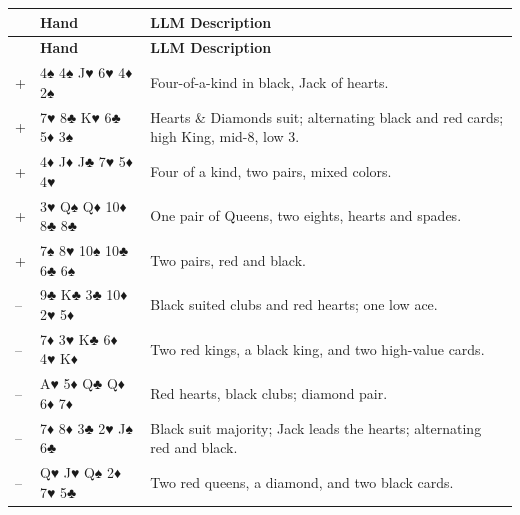 \documentclass[11pt,a4paper]{article}
\begin{document}
\begin{longtable}{C{0.5cm} L{4.5cm} L{9cm}}
\toprule
\textbf{} & \textbf{Hand} & \textbf{LLM Description} \\
\midrule
\endfirsthead
\toprule
\textbf{} & \textbf{Hand} & \textbf{LLM Description} \\
\midrule
\endhead
{} + & 4♠ 4♠ J♥ 6♥ 4♦ 2♠ & Four-of-a-kind in black, Jack of hearts. \\
 + & 7♥ 8♣ K♥ 6♣ 5♦ 3♠ & Hearts \& Diamonds suit; alternating black and red cards; high King, mid-8, low 3. \\
 + & 4♦ J♦ J♣ 7♥ 5♦ 4♥ & Four of a kind, two pairs, mixed colors. \\
 + & 3♥ Q♠ Q♦ 10♦ 8♣ 8♣ & One pair of Queens, two eights, hearts and spades. \\
 + & 7♠ 8♥ 10♠ 10♣ 6♣ 6♠ & Two pairs, red and black. \\
 -- & 9♣ K♣ 3♣ 10♦ 2♥ 5♦ & Black suited clubs and red hearts; one low ace. \\
 -- & 7♦ 3♥ K♣ 6♦ 4♥ K♦ & Two red kings, a black king, and two high-value cards. \\
 -- & A♥ 5♦ Q♣ Q♦ 6♦ 7♦ & Red hearts, black clubs; diamond pair. \\
 -- & 7♦ 8♦ 3♣ 2♥ J♠ 6♣ & Black suit majority; Jack leads the hearts; alternating red and black. \\
 -- & Q♥ J♥ Q♠ 2♦ 7♥ 5♣ & Two red queens, a diamond, and two black cards. \\
\bottomrule
\end{longtable}
\end{document}
